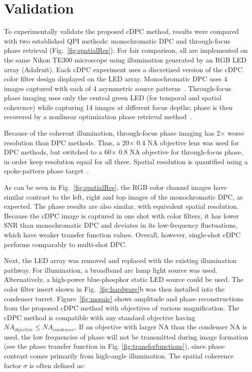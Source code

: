 \clearpage

\section{Validation}

To experimentally validate the proposed cDPC method, results were compared with two established QPI methods: monochromatic DPC and through-focus phase retrieval (Fig.~\ref{fig:spatialRes}). For fair comparison, all are implemented on the same Nikon TE300 microscope using illumination generated by an RGB LED array (Adafruit). Each cDPC experiment uses a discretized version of the cDPC color filter design displayed on the LED array. Monochromatic DPC uses 4 images captured with each of 4 asymmetric source patterns~\cite{zijiMulti}. Through-focus phase imaging uses only the central green LED (for temporal and spatial coherence) while capturing 14 images at different focus depths; phase is then recovered by a nonlinear optimization phase retrieval method~\cite{JingsanSourceRecovery2016}.

Because of the coherent illumination, through-focus phase imaging has 2$\times$ worse resolution than DPC methods. Thus, a 20$\times$ 0.4 NA objective lens was used for DPC methods, but switched to a 60$\times$ 0.8 NA objective for through-focus phase, in order keep resolution equal for all three. Spatial resolution is quantified using a spoke-pattern phase target~\cite{standardphaseresolution2016}.

As can be seen in Fig.~\ref{fig:spatialRes}, the RGB color channel images have similar contrast to the left, right and top images of the monochromatic DPC, as expected. The phase results are also similar, with equivalent spatial resolution. Because the cDPC image is captured in one shot with color filters, it has lower SNR than monochromatic DPC and deviates in its low-frequency fluctuations, which have weaker transfer function values. Overall, however, single-shot cDPC performs comparably to multi-shot DPC.

Next, the LED array was removed and replaced with the existing illumination pathway. For illumination, a broadband arc lamp light source was used. Alternatively, a high-power blue-phosphor static LED source could be used. The color filter insert shown in Fig.~\ref{fig:hardware}b was then installed into the condenser turret. Figure~\ref{fig:mosaic} shows amplitude and phase reconstructions from the proposed cDPC method with objectives of various magnification. The cDPC method is compatible with any standard objective having $ NA_{objective}\leq NA_{condenser}$. If an objective with larger NA than the condenser NA is used, the low frequencies of phase will not be transmitted during image formation (see the phase transfer function in Fig. \ref{fig:transferfunctions}), since phase contrast comes primarily from high-angle illumination. The spatial coherence factor $\sigma$ is often defined as:

